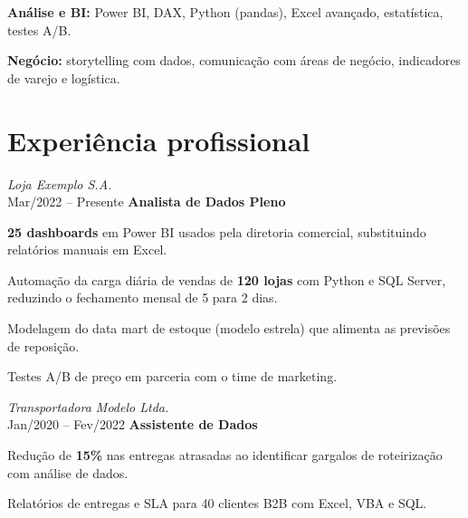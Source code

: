         \vspace{0.12 cm}

        \begin{onecolentry}
            \textbf{Análise e BI:} Power BI, DAX, Python (pandas), Excel avançado, estatística, testes A/B.
        \end{onecolentry}

        \vspace{0.12 cm}

        \begin{onecolentry}
            \textbf{Negócio:} storytelling com dados, comunicação com áreas de negócio, indicadores de varejo e logística.
        \end{onecolentry}

    \section{Experiência profissional}
        \begin{twocolentry}{
            \textit{Loja Exemplo S.A.} \\
            Mar/2022 -- Presente
        }
            \textbf{Analista de Dados Pleno}
        \end{twocolentry}
        \vspace{0.10cm}
        \begin{onecolentry}
            \begin{highlights}
                \item \textbf{25 dashboards} em Power BI usados pela diretoria comercial, substituindo relatórios manuais em Excel.
                \item Automação da carga diária de vendas de \textbf{120 lojas} com Python e SQL Server, reduzindo o fechamento mensal de 5 para 2 dias.
                \item Modelagem do data mart de estoque (modelo estrela) que alimenta as previsões de reposição.
                \item Testes A/B de preço em parceria com o time de marketing.
            \end{highlights}
        \end{onecolentry}
        \vspace{0.2cm}

        \begin{twocolentry}{
            \textit{Transportadora Modelo Ltda.} \\
            Jan/2020 -- Fev/2022
        }
            \textbf{Assistente de Dados}
        \end{twocolentry}
        \vspace{0.10cm}
        \begin{onecolentry}
            \begin{highlights}
                \item Redução de \textbf{15\%} nas entregas atrasadas ao identificar gargalos de roteirização com análise de dados.
                \item Relatórios de entregas e SLA para 40 clientes B2B com Excel, VBA e SQL.
            \end{highlights}
        \end{onecolentry}

